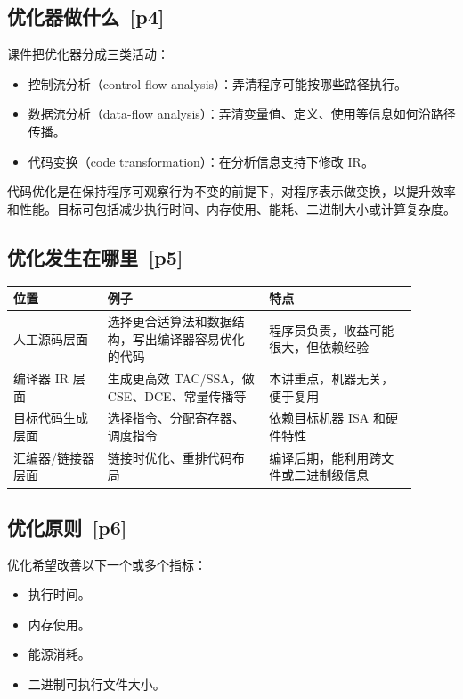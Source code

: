 \documentclass[UTF8,fontset=none,11pt]{ctexart}
\newenvironment{defbox}[1][]{%
  \par\medskip\noindent{\color{defrule}\rule{\linewidth}{1.1pt}}\par\nopagebreak
  \noindent{\bfseries\color{defrule}#1}\par\nopagebreak\smallskip}%
  {\par\nopagebreak\smallskip\noindent{\color{defrule}\rule{\linewidth}{0.4pt}}\par\medskip}
\newcommand{\pg}[1]{\texorpdfstring{{\small\color{graytext}\,[p#1]}}{ [p#1]}}
\begin{document}
\subsection{优化器做什么 \pg{4}}

课件把优化器分成三类活动：

\begin{itemize}
  \item 控制流分析（control-flow analysis）：弄清程序可能按哪些路径执行。
  \item 数据流分析（data-flow analysis）：弄清变量值、定义、使用等信息如何沿路径传播。
  \item 代码变换（code transformation）：在分析信息支持下修改 IR。
\end{itemize}

\begin{defbox}[代码优化]
代码优化是在保持程序可观察行为不变的前提下，对程序表示做变换，以提升效率和性能。目标可包括减少执行时间、内存使用、能耗、二进制大小或计算复杂度。
\end{defbox}

\subsection{优化发生在哪里 \pg{5}}

\begin{longtable}{L{0.21\linewidth}L{0.36\linewidth}L{0.33\linewidth}}
\toprule
位置 & 例子 & 特点 \\
\midrule
人工源码层面 & 选择更合适算法和数据结构，写出编译器容易优化的代码 & 程序员负责，收益可能很大，但依赖经验 \\
编译器 IR 层面 & 生成更高效 TAC/SSA，做 CSE、DCE、常量传播等 & 本讲重点，机器无关，便于复用 \\
目标代码生成层面 & 选择指令、分配寄存器、调度指令 & 依赖目标机器 ISA 和硬件特性 \\
汇编器/链接器层面 & 链接时优化、重排代码布局 & 编译后期，能利用跨文件或二进制级信息 \\
\bottomrule
\end{longtable}

\subsection{优化原则 \pg{6}}

优化希望改善以下一个或多个指标：

\begin{itemize}
  \item 执行时间。
  \item 内存使用。
  \item 能源消耗。
  \item 二进制可执行文件大小。
\end{itemize}
\end{document}
